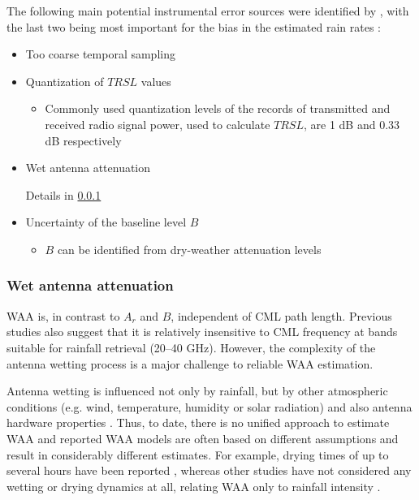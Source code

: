\documentclass{ctuthesis}\usepackage[]{graphicx}\usepackage[]{color}
\begin{document}
The following main potential instrumental error sources were identified by \cite{leijnseErrorsUncertaintiesMicrowave2010}, with the last two being most important for the bias in the estimated rain rates \citep{chwalaCommercialMicrowaveLink2019}: 
\begin{itemize}
        \item Too coarse temporal sampling
        \item Quantization of $T\!R\!S\!L$ values 
        \begin{itemize}
                \item Commonly used quantization levels of the records of transmitted and received radio signal power, used to calculate $T\!R\!S\!L$, are 1 dB and 0.33 dB respectively
        \end{itemize}
        \item Wet antenna attenuation
        \begin{itemize}
                Details in \ref{WAAtheor}
        \end{itemize}
        \item Uncertainty of the baseline level $B$
        \begin{itemize}
                \item $B$ can be identified from dry-weather attenuation levels
        \end{itemize}
\end{itemize}




\subsubsection{Wet antenna attenuation} \label{WAAtheor}

WAA is, in contrast to $A_r$ and $B$, independent of CML path length. Previous studies \citep{leijnseMicrowaveLinkRainfall2008, overeemMeasuringUrbanRainfall2011} also suggest that it is relatively insensitive to CML frequency at bands suitable for rainfall retrieval (20--40 GHz). However, the complexity of the antenna wetting process is a major challenge to reliable WAA estimation. 

Antenna wetting is influenced not only by rainfall, but by other atmospheric conditions (e.g. wind, temperature, humidity or solar radiation) and also  antenna hardware properties \citep[e.g. antenna radome material or coating;][]{lethMeasurementCampaignAssess2018}. Thus, to date, there is no unified approach to estimate WAA and reported WAA models are often based on different assumptions and result in considerably different estimates. For example, drying times of up to several hours have been reported \citep{schleissQuantificationModelingWetAntenna2013}, whereas other studies have not considered any wetting or drying dynamics at all, relating WAA only to rainfall intensity \citep{valtrExcessAttenuationCaused2019, kharadlyEffectWetAntenna2001}. 
\end{document}
